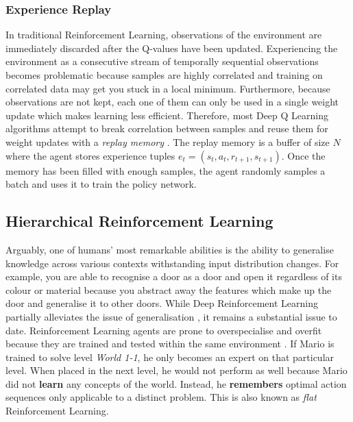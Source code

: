 \documentclass[notitlepage,a4paper,11pt]{article}
\begin{document}
\subsubsection{Experience Replay}
In traditional Reinforcement Learning, observations of the environment are immediately discarded after the Q-values have been updated. Experiencing the environment as a consecutive stream of temporally sequential observations becomes problematic because samples are highly correlated and training on correlated data may get you stuck in a local minimum. Furthermore, because observations are not kept, each one of them can only be used in a single weight update which makes learning less efficient. Therefore, most Deep Q Learning algorithms attempt to break correlation between samples and reuse them for weight updates with a \textit{replay memory} \cite{lin1993reinforcement}. The replay memory is a buffer of size $N$ where the agent stores experience tuples $e_t = (s_t, a_t, r_{t+1}, s_{t+1})$. Once the memory has been filled with enough samples, the agent randomly samples a batch and uses it to train the policy network. 


\subsection{Hierarchical Reinforcement Learning}
Arguably, one of humans' most remarkable abilities is the ability to generalise knowledge \cite{geirhos2018generalisation} across various contexts withstanding input distribution changes. For example, you are able to recognise a door as a door and open it regardless of its colour or material because you abstract away the features which make up the door and generalise it to other doors. While Deep Reinforcement Learning partially alleviates the issue of generalisation \cite{sutton1996generalization}, it remains a substantial issue \cite{van2017hybrid} to date. Reinforcement Learning agents are prone to overspecialise and overfit because they are trained and tested within the same environment \cite{cobbe2018quantifying}. If Mario is trained to solve level \textit{World 1-1}, he only becomes an expert on that particular level. When placed in the next level, he would not perform as well because Mario did not \textbf{learn} any concepts of the world. Instead, he \textbf{remembers} optimal action sequences only applicable to a distinct problem. This is also known as \textit{flat} Reinforcement Learning.
\end{document}
